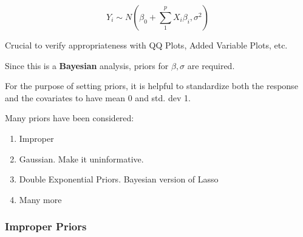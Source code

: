 \documentclass[11pt]{article}
\begin{document}
$$
Y_i \sim N(\beta_0 + \sum_{1}^{p} X_i \beta_i, \sigma^2)
$$

Crucial to verify appropriateness with QQ Plots, Added Variable Plots, etc.

Since this is a \textbf{Bayesian} analysis, priors for \(\beta, \sigma\) are required.

For the purpose of setting priors, it is helpful to standardize both the
response and the covariates to have mean 0 and std. dev 1.

Many priors have been considered:
\begin{enumerate}
\item Improper
\item Gaussian. Make it uninformative.
\item Double Exponential Priors. Bayesian version of Lasso
\item Many more
\end{enumerate}

\subsubsection{Improper Priors}
\label{sec:org3cdee9c}
\end{document}
